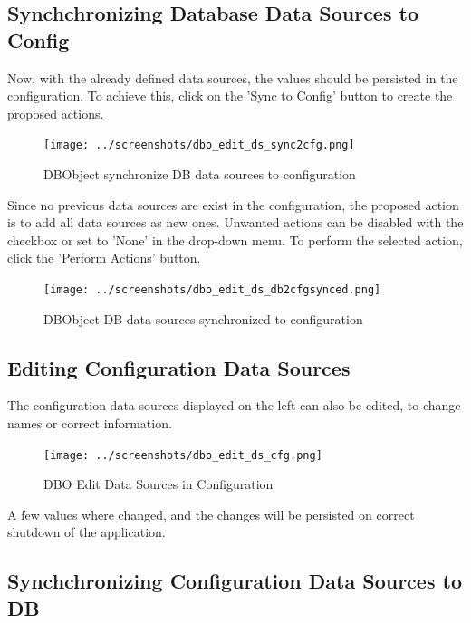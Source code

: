 \subsection{Synchchronizing Database Data Sources to Config}

Now, with the already defined data sources, the values should be persisted in the configuration. To achieve this, click on the 'Sync to Config' button to create the proposed actions.

\begin{figure}[H]
  \hspace*{-2cm}
    \texttt{[image: ../screenshots/dbo\_edit\_ds\_sync2cfg.png]}
  \caption{DBObject synchronize DB data sources to configuration }
  \label{fig:dbo_edit_ds_sync2cfg}
\end{figure}

Since no previous data sources are exist in the configuration, the proposed action is to add all data sources as new ones. Unwanted actions can be disabled with the checkbox or set to 'None' in the drop-down menu. To perform the selected action, click the 'Perform Actions' button.

\begin{figure}[H]
  \hspace*{-2cm}
    \texttt{[image: ../screenshots/dbo\_edit\_ds\_db2cfgsynced.png]}
  \caption{DBObject DB data sources synchronized to configuration }
  \label{fig:dbo_edit_ds_db2cfgsynced}
\end{figure}

\subsection{Editing Configuration Data Sources}

The configuration data sources displayed on the left can also be edited, to change names or correct information.

\begin{figure}[H]
  \hspace*{-2cm}
    \texttt{[image: ../screenshots/dbo\_edit\_ds\_cfg.png]}
  \caption{DBO Edit Data Sources in Configuration}
  \label{fig:dbo_edit_ds_cfg}
\end{figure}

A few values where changed, and the changes will be persisted on correct shutdown of the application.

\subsection{Synchchronizing Configuration Data Sources to DB}

